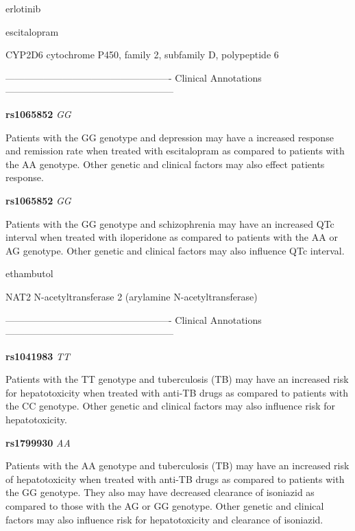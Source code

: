 \documentclass{resume} %
\begin{document}
\begin{rSection}{ erlotinib }
\end{rSection}\begin{rSection}{ escitalopram }
\item[]

\begin{rSubsection}{ CYP2D6 }{ cytochrome P450, family 2, subfamily D, polypeptide 6 }{}{}
\item[]

\item[] ---------------------------------------------------- Clinical Annotations -----------------------------------------------------\newline
\item \textbf{ rs1065852 } \textit{ GG }
\item[] Patients with the GG genotype and depression may have a increased response and remission rate when treated with escitalopram as compared to patients with the AA genotype. Other genetic and clinical factors may also effect patients response.\item \textbf{ rs1065852 } \textit{ GG }
\item[] Patients with the GG genotype and schizophrenia may have an increased QTc interval when treated with iloperidone as compared to patients with the AA or AG genotype. Other genetic and clinical factors may also influence QTc interval.
\end{rSubsection}

\end{rSection}\begin{rSection}{ ethambutol }
\item[]

\begin{rSubsection}{ NAT2 }{ N-acetyltransferase 2 (arylamine N-acetyltransferase) }{}{}
\item[]

\item[] ---------------------------------------------------- Clinical Annotations -----------------------------------------------------\newline
\item \textbf{ rs1041983 } \textit{ TT }
\item[] Patients with the TT genotype and tuberculosis (TB) may have an increased risk for hepatotoxicity when treated with anti-TB drugs as compared to patients with the CC genotype. Other genetic and clinical factors may also influence risk for hepatotoxicity.\item \textbf{ rs1799930 } \textit{ AA }
\item[] Patients with the AA genotype and tuberculosis (TB) may have an increased risk of hepatotoxicity when treated with anti-TB drugs as compared to patients with the GG genotype. They also may have decreased clearance of isoniazid as compared to those with the AG or GG genotype. Other genetic and clinical factors may also influence risk for hepatotoxicity and clearance of isoniazid.
\end{rSubsection}


\end{rSection}
\end{document}
